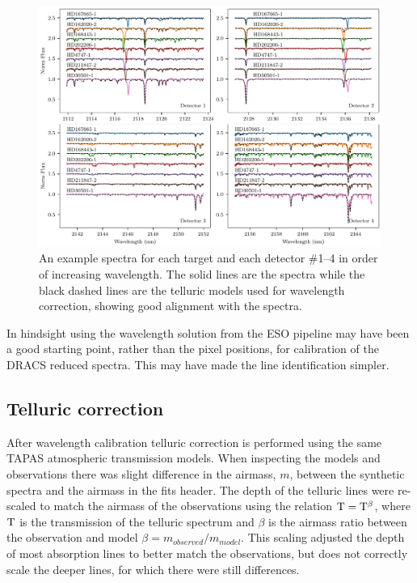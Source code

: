 \begin{figure}
    \centering
    \includegraphics[width=1\linewidth]{figures/reduction/Spectra_examples}
    \caption{An example spectra for each target and each detector \#1--4 in order of increasing wavelength.
The solid lines are the spectra while the black dashed lines are the telluric models used for wavelength correction, showing good alignment with the spectra.}
    \label{fig:spectraexamples}
\end{figure}




In hindsight using the wavelength solution from the {ESO} pipeline may have been a good starting point, rather than the pixel positions, for calibration of the {DRACS} reduced spectra.
This may have made the line identification simpler.


\subsection{Telluric correction}
\label{subsec:telluric_correction_application}
After wavelength calibration telluric correction is performed using the same {TAPAS} atmospheric transmission models.
When inspecting the models and observations there was slight difference in the airmass, $m$, between the synthetic spectra and the airmass in the fits header.
The depth of the telluric lines were re-scaled to match the airmass of the observations using the relation \(\rm T = T^{\beta}\), where \(\rm T\) is the transmission of the telluric spectrum and \(\beta\) is the airmass ratio between the observation and model $\beta ={m_{observed}/m_{model}}$.
This scaling adjusted the depth of most absorption lines to better match the observations, but does not correctly scale the deeper  lines, for which there were still differences.


